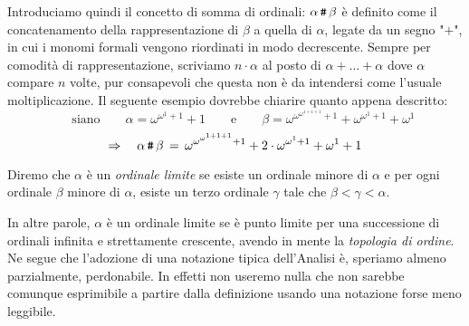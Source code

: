 		Introduciamo quindi il concetto di somma di ordinali: $\alpha\,\texttt{\#}\,\beta$ è definito come il concatenamento della rappresentazione di $\beta$ a quella di $\alpha$, legate da un segno "$+$", in cui i monomi formali vengono riordinati in modo decrescente. Sempre per comodità di rappresentazione, scriviamo $n\cdot\alpha$ al posto di $\alpha+\ldots+\alpha$ dove $\alpha$ compare $n$ volte, pur consapevoli che questa non è da intendersi come l'usuale moltiplicazione. Il seguente esempio dovrebbe chiarire quanto appena descritto:
	\begin{equation}
		\quad \; \mathrm{siano} \qquad \alpha = \omega^{\omega^{1}+1}+1 \qquad \mathrm{e} \qquad \beta = \omega^{\omega^{\omega^{1+1+1}}+1}+\omega^{\omega^{1}+1}+\omega^{1} \nonumber %
	\end{equation}
	\begin{equation}
		\Rightarrow \quad \alpha\,\texttt{\#}\,\beta\, =\, \omega^{\omega^{\omega^{1+1+1}}+1}+2\cdot\omega^{\omega^{1}+1}+\omega^{1}+1 \nonumber
	\end{equation}
	\begin{defin}
		Diremo che $\alpha$ è un \emph{ordinale limite} se esiste un ordinale minore di $\alpha$ e per ogni ordinale $\beta$ minore di $\alpha$, esiste un terzo ordinale $\gamma$ tale che $\beta<\gamma<\alpha$.
	\end{defin}
		In altre parole, $\alpha$ è un ordinale limite se è punto limite per una successione di ordinali infinita e strettamente crescente, avendo in mente la \emph{topologia di ordine}. Ne segue che l'adozione di una notazione tipica dell'Analisi è, speriamo almeno parzialmente, perdonabile. In effetti non useremo nulla che non sarebbe comunque esprimibile a partire dalla definizione usando una notazione forse meno leggibile.
		

